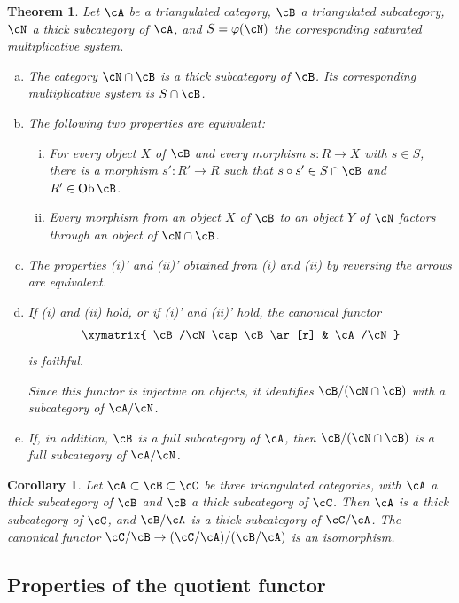 \documentclass[12pt,oneside,english]{smfbook}
\newtheorem{corollary}[subsubsection]{Corollary}
\newtheorem{theorem}[subsubsection]{Theorem}
\begin{document}
\begin{theorem}\label{VIII:2-4-2}
Let $\cA$ be a triangulated category, $\cB$ a triangulated subcategory, $\cN$ a thick subcategory of $\cA$, and $S=\varphi(\cN)$ the corresponding saturated multiplicative system.
\begin{enumerate}[(a)]
  \item The category $\cN\cap\cB$ is a thick subcategory of $\cB$. Its corresponding multiplicative system is $S\cap\cB$.
  \item The following two properties are equivalent:
    \begin{enumerate}[(i)]
      \item For every object $X$ of $\cB$ and every morphism $s:R\to X$ with $s\in S$, there is a morphism $s':R'\to R$ such that $s\circ s'\in S\cap\cB$ and $R'\in\operatorname{Ob}\cB$.
      \item Every morphism from an object $X$ of $\cB$ to an object $Y$ of $\cN$ factors through an object of $\cN\cap\cB$.
    \end{enumerate}
  \item The properties (i)' and (ii)' obtained from (i) and (ii) by reversing the arrows are equivalent.
  \item If (i) and (ii) hold, or if (i)' and (ii)' hold, the canonical functor
    \[\xymatrix{
      \cB/\cN\cap \cB \ar[r] & \cA/\cN
    }\]
    is faithful.

    Since this functor is injective on objects, it identifies $\cB/(\cN\cap\cB)$ with a subcategory of $\cA/\cN$.
  \item If, in addition, $\cB$ is a full subcategory of $\cA$, then $\cB/(\cN\cap\cB)$ is a full subcategory of $\cA/\cN$.
\end{enumerate}
\end{theorem}

\begin{corollary}\label{VIII:2-4-3}
Let $\cA\subset\cB\subset\cC$ be three triangulated categories, with $\cA$ a thick subcategory of $\cB$ and $\cB$ a thick subcategory of $\cC$. Then $\cA$ is a thick subcategory of $\cC$, and $\cB/\cA$ is a thick subcategory of $\cC/\cA$. The canonical functor $\cC/\cB\to(\cC/\cA)/(\cB/\cA)$ is an isomorphism.
\end{corollary}

\subsection{Properties of the quotient functor}\label{VIII:2-5}
\end{document}
